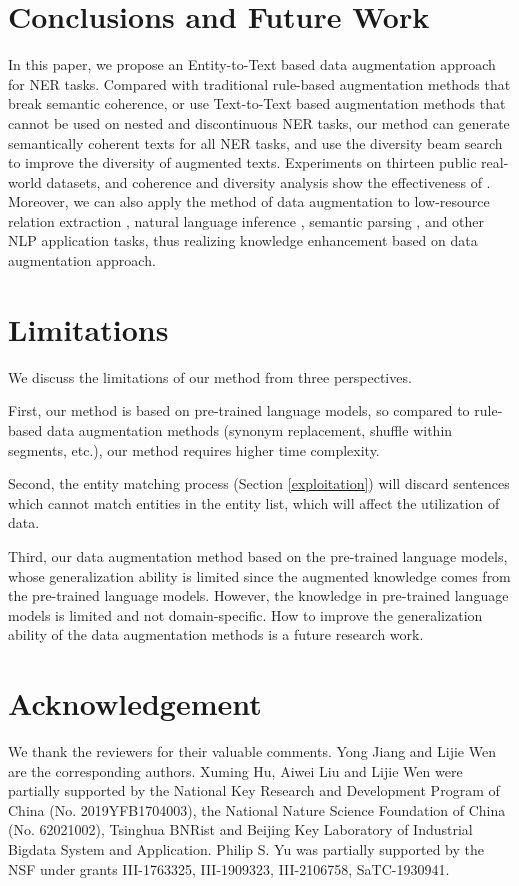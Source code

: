 \section{Conclusions and Future Work}
\label{sec:conclusion}
In this paper, we propose an Entity-to-Text based data augmentation approach {\modelname} for NER tasks. 
Compared with traditional rule-based augmentation methods that break semantic coherence, or use Text-to-Text based augmentation methods that cannot be used on nested and discontinuous NER tasks, our method can generate semantically coherent texts for all NER tasks, and use the diversity beam search to improve the diversity of augmented texts. Experiments on thirteen public real-world datasets, and coherence and diversity analysis show the effectiveness of {\modelname}. Moreover, we can also apply the method of data augmentation to low-resource relation extraction \cite{hu2020selfore,hu2021gradient,hu2021semi,liu2022hierarchical,hu2023think}, natural language inference \cite{li2023multi,li2022pair}, semantic parsing \cite{liu2022semantic,liu2023comprehensive}, and other NLP application tasks, thus realizing knowledge enhancement based on data augmentation approach.

\section{Limitations}
We discuss the limitations of our method from three perspectives. 

First, our method is based on pre-trained language models, so compared to rule-based data augmentation methods (synonym replacement, shuffle within segments, etc.), our method requires higher time complexity. 

Second, the entity matching process (Section \ref{exploitation}) will discard sentences which cannot match entities in the entity list, which will affect the utilization of data. 

Third, our data augmentation method based on the pre-trained language models, whose generalization ability is limited since the augmented knowledge comes from the pre-trained language models. However, the knowledge in pre-trained language models is limited and not domain-specific. How to improve the generalization ability of the data augmentation methods is a future research work.

\section{Acknowledgement}
We thank the reviewers for their valuable comments. Yong Jiang and Lijie Wen are the corresponding authors. Xuming Hu, Aiwei Liu and Lijie Wen were partially supported by the National Key Research and Development Program of China (No. 2019YFB1704003), the National Nature Science Foundation of China (No. 62021002), Tsinghua BNRist and Beijing Key Laboratory of Industrial Bigdata System and Application. Philip S. Yu was partially supported by the NSF under grants III-1763325, III-1909323, III-2106758, SaTC-1930941.

\clearpage
\newpage

